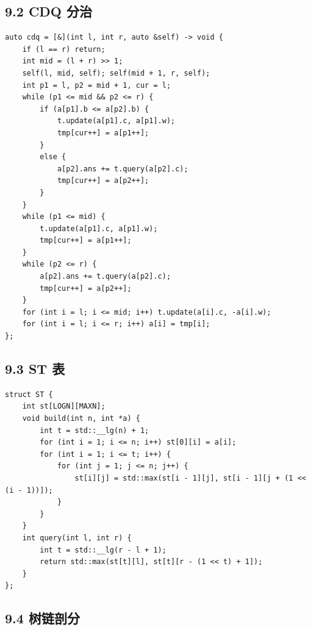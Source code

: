 \documentclass[UTF8,a4paper,11pt]{ctexart}
\begin{document}
\subsection*{9.2 CDQ 分治}

\begin{Verbatim}[fontsize=\small,frame=single,breaklines=true,breakanywhere=true]
auto cdq = [&](int l, int r, auto &self) -> void {
    if (l == r) return;
    int mid = (l + r) >> 1;
    self(l, mid, self); self(mid + 1, r, self);
    int p1 = l, p2 = mid + 1, cur = l;
    while (p1 <= mid && p2 <= r) {
        if (a[p1].b <= a[p2].b) {
            t.update(a[p1].c, a[p1].w);
            tmp[cur++] = a[p1++];
        }
        else {
            a[p2].ans += t.query(a[p2].c);
            tmp[cur++] = a[p2++];
        }
    }
    while (p1 <= mid) {
        t.update(a[p1].c, a[p1].w);
        tmp[cur++] = a[p1++];
    }
    while (p2 <= r) {
        a[p2].ans += t.query(a[p2].c);
        tmp[cur++] = a[p2++];
    }
    for (int i = l; i <= mid; i++) t.update(a[i].c, -a[i].w);
    for (int i = l; i <= r; i++) a[i] = tmp[i];
};
\end{Verbatim}

\subsection*{9.3 ST 表}

\begin{Verbatim}[fontsize=\small,frame=single,breaklines=true,breakanywhere=true]
struct ST {
    int st[LOGN][MAXN];
    void build(int n, int *a) {
        int t = std::__lg(n) + 1;
        for (int i = 1; i <= n; i++) st[0][i] = a[i];
        for (int i = 1; i <= t; i++) {
            for (int j = 1; j <= n; j++) {
                st[i][j] = std::max(st[i - 1][j], st[i - 1][j + (1 << (i - 1))]);
            }
        }
    }
    int query(int l, int r) {
        int t = std::__lg(r - l + 1);
        return std::max(st[t][l], st[t][r - (1 << t) + 1]);
    }
};
\end{Verbatim}

\subsection*{9.4 树链剖分}
\end{document}
